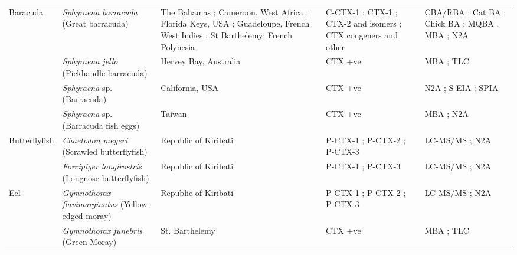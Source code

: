 \documentclass[12pt]{article}
\begin{document}
\begin{longtable}{ | p{2cm} | p{3cm} | p{4.5cm} | p{2cm} | p{3cm} | }
	\hline
	Baracuda & \emph{Sphyraena barracuda} (Great barracuda) & The Bahamas \cite{o2012linking}; Cameroon, West Africa \cite{bienfang2008ciguatera}; Florida Keys, USA \cite{dechraoui2005use}; Guadeloupe, French West Indies \cite{pottier2003identification,pottier2001ciguatera}; St Barthelemy\cite{pottier2001ciguatera,vernoux1986heterogeneity}; French Polynesia \cite{bagnis1987use,chinain2014mail} & C-CTX-1 \cite{dechraoui2005use,pottier2003identification}; CTX-1 \cite{pottier2003identification}; CTX-2 and isomers \cite{pottier2003identification}; CTX congeners and other \cite{pottier2003identification}& CBA/RBA \cite{chinain2014mail}; Cat BA \cite{bagnis1987use}; Chick BA \cite{pottier2001ciguatera}; MQBA \cite{bagnis1987use}, MBA \cite{bagnis1987use,pottier2002characterisation,pottier2003identification}; N2A \cite{o2012linking} \\
	& \emph{Sphyraena jello} (Pickhandle barracuda) & Hervey Bay, Australia \cite{lewis1984ciguatoxin} & CTX +ve \cite{lewis1984ciguatoxin} & MBA \cite{lewis1984ciguatoxin}; TLC \cite{lewis1984ciguatoxin} \\
	& \emph{Sphyraena} sp. (Barracuda) & California, USA \cite{hokama1990simplified} & CTX +ve \cite{hokama1990simplified} & N2A \cite{hokama1990simplified}; S-EIA \cite{hokama1990simplified}; SPIA \cite{hokama1990simplified} \\
	& \emph{Sphyraena} sp. (Barracuda fish eggs) & Taiwan \cite{hung2005persistent} & CTX +ve \cite{hung2005persistent} & MBA \cite{hung2005persistent}; N2A \cite{hung2005persistent} \\
	\hline
	Butterflyfish & \emph{Chaetodon meyeri} (Scrawled butterflyfish) & Republic of Kiribati \cite{mak2013pacific} & P-CTX-1 \cite{mak2013pacific}; P-CTX-2 \cite{mak2013pacific}; P-CTX-3 \cite{mak2013pacific} & LC-MS/MS \cite{mak2013pacific}; N2A \cite{mak2013pacific} \\
	 & \emph{Forcipiger longirostris} (Longnose butterflyfish) & Republic of Kiribati \cite{mak2013pacific} & P-CTX-1 \cite{mak2013pacific}; P-CTX-3 \cite{mak2013pacific} & LC-MS/MS \cite{mak2013pacific}; N2A \cite{mak2013pacific} \\
	 \hline
	Eel & \emph{Gymnothorax flavimarginatus} (Yellow-edged moray) & Republic of Kiribati \cite{mak2013pacific} & P-CTX-1 \cite{mak2013pacific}; P-CTX-2 \cite{mak2013pacific}; P-CTX-3 \cite{mak2013pacific} & LC-MS/MS \cite{mak2013pacific}; N2A \cite{mak2013pacific} \\
	& \emph{Gymnothorax funebris} (Green Moray) & St. Barthelemy \cite{vernoux1986heterogeneity} & CTX +ve \cite{vernoux1986heterogeneity} & MBA \cite{vernoux1986heterogeneity}; TLC \cite{vernoux1986heterogeneity} \\

\end{longtable}
\end{document}
